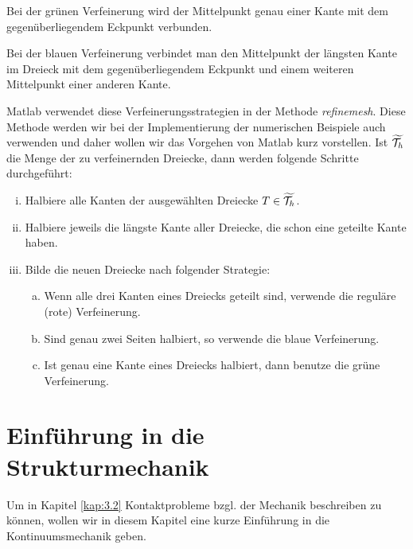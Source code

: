 Bei der grünen Verfeinerung wird der Mittelpunkt genau einer Kante mit dem gegenüberliegendem Eckpunkt verbunden.

Bei der blauen Verfeinerung verbindet man den Mittelpunkt der längsten Kante im Dreieck mit dem gegenüberliegendem Eckpunkt und einem weiteren Mittelpunkt einer anderen Kante.

Matlab verwendet diese Verfeinerungsstrategien in der Methode \textit{refinemesh}. Diese Methode werden wir bei der Implementierung der numerischen Beispiele auch verwenden und daher wollen wir das Vorgehen von Matlab kurz vorstellen. Ist $\widetilde{\mathcal T_h}$ die Menge der zu verfeinernden Dreiecke, dann werden folgende Schritte durchgeführt:
\begin{enumerate}[(i)]
\item Halbiere alle Kanten der ausgewählten Dreiecke $T \in \widetilde{\mathcal T_h}$.
\item Halbiere jeweils die längste Kante aller Dreiecke, die schon eine geteilte Kante haben. 
\item Bilde die neuen Dreiecke nach folgender Strategie:
\begin{enumerate}[(a)]
\item Wenn alle drei Kanten eines Dreiecks geteilt sind, verwende die reguläre (rote) Verfeinerung.
\item Sind genau zwei Seiten halbiert, so verwende die blaue Verfeinerung.
\item Ist genau eine Kante eines Dreiecks halbiert, dann benutze die grüne Verfeinerung.
\end{enumerate}
\end{enumerate}





\section{Einführung in die Strukturmechanik}
\label{kap:2.5}


Um in Kapitel \ref{kap:3.2} Kontaktprobleme bzgl. der Mechanik beschreiben zu können, wollen wir in diesem Kapitel eine kurze Einführung in die Kontinuumsmechanik geben.


